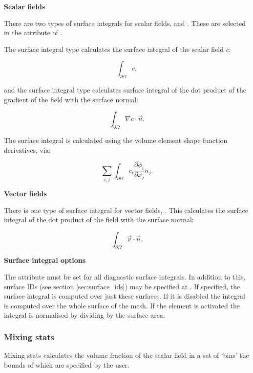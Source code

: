 \textbf{Scalar fields}

There are two types of surface integrals for scalar fields,  and
. These are selected in the  attribute of
.

The surface integral type  calculates the surface integral of the
scalar field $c$:

\begin{equation}
\int_{\partial \Omega} c,
\end{equation}

and the surface integral type  calculates surface integral
of the dot product of the gradient of the field with the surface normal:

\begin{equation}
\int_{\partial \Omega} \nabla c \cdot \vec{n}.
\end{equation}

The  surface integral is calculated using the volume
element shape function derivatives, via:

\begin{equation}
\sum_{i,j} \int_{\partial \Omega} {c_i \frac{\partial \phi_i}{\partial x_j} n_j}.
\end{equation}

\textbf{Vector fields}

There is one type of surface integral for vector fields, . This
calculates the surface integral of the dot product of the field with the surface
normal:

\begin{equation}
\int_{\partial \Omega} \vec{v} \cdot \vec{n}.
\end{equation}

\textbf{Surface integral options}

The  attribute must be set for all diagnostic surface integrals. In
addition to this, surface IDs (see section \ref{sec:surface_ids}) may be specified at
. If specified, the surface
integral is computed over just these surfaces. If it is disabled the integral is computed
over the whole surface of the
mesh. If the element  is activated
the integral is normalised by dividing by the surface area.

\subsubsection{Mixing stats}
\label{sec:stat_mixing_stats}
Mixing stats calculates the volume fraction of the scalar field in a set of `bins' the bounds of which are specified by the user.


